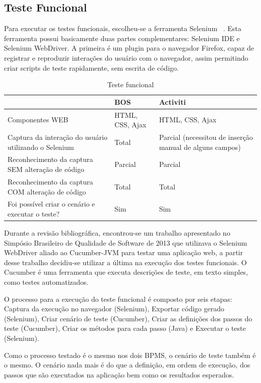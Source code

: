 \documentclass[12pt]{article}
\begin{document}
\subsection{Teste Funcional}
Para executar os testes funcionais, escolheu-se a ferramenta Selenium ~\cite{SELENIUM}. Esta ferramenta possui basicamente duas partes complementares: Selenium IDE e Selenium WebDriver. A primeira é um plugin para o navegador Firefox, capaz de registrar e reproduzir interações do usuário com o navegador, assim permitindo criar scripts de teste rapidamente, sem escrita de código.


\begin{table}
{\scriptsize
\begin{tabular}{|p{4cm}|p{4cm}|p{4cm}|}
\hline
 & BOS & Activiti \\\hline
Componentes WEB & HTML, CSS, Ajax & HTML, CSS, Ajax \\\hline
Captura da interação do usuário utilizando o Selenium & Total & Parcial (necessitou de inserção manual de alguns campos) \\\hline
Reconhecimento da captura SEM alteração de código & Parcial & Parcial \\\hline
Reconhecimento da captura COM alteração de código & Total & Total \\\hline
Foi possível criar o cenário e executar o teste? & Sim & Sim \\\hline
\end{tabular}
}
\caption{Teste funcional}
\label{tab:testeFuncional}
\end{table}



Durante a revisão bibliográfica, encontrou-se um trabalho apresentado no Simpósio Brasileiro de Qualidade de Software de 2013 \cite{sbqs2013} que utilizava o Selenium WebDriver aliado ao Cucumber-JVM \cite{CUCUMBER} para testar uma aplicação web, a partir desse trabalho decidiu-se utilizar a última na execução dos testes funcionais. O Cucumber é uma ferramenta que executa descrições de teste, em texto simples, como testes automatizados.


O processo para a execução do teste funcional é composto por seis etapas: Captura da execução no navegador (Selenium), Exportar código gerado (Selenium), Criar cenário de teste (Cucumber), Criar as definições dos passos do teste (Cucumber), Criar os métodos para cada passo (Java) e Executar o teste (Selenium).

Como o processo testado é o mesmo nos dois BPMS, o cenário de teste também é o mesmo. O cenário nada mais é do que a definição, em ordem de execução, dos passos que são executados na aplicação bem como  os resultados esperados.
\end{document}
